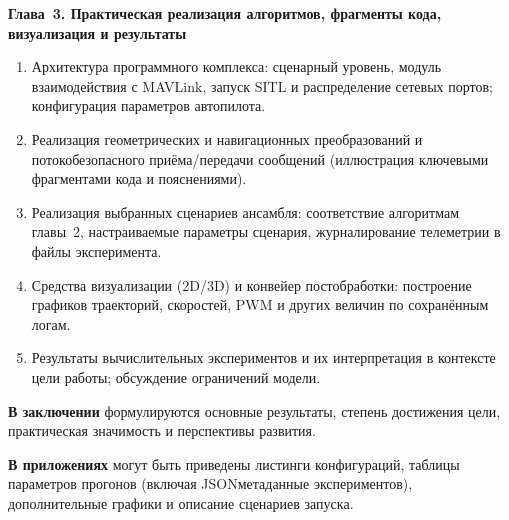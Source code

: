 \documentclass[12pt,a4paper]{article}
\begin{document}
\textbf{Глава~3. Практическая реализация алгоритмов, фрагменты кода,
визуализация и результаты}
\begin{enumerate}
  \item Архитектура программного комплекса: сценарный уровень,
    модуль взаимодействия с MAVLink, запуск SITL и распределение
    сетевых портов; конфигурация параметров автопилота.
  \item Реализация геометрических и навигационных преобразований
    и потокобезопасного приёма/передачи сообщений (иллюстрация
    ключевыми фрагментами кода и пояснениями).
  \item Реализация выбранных сценариев ансамбля: соответствие
    алгоритмам главы~2, настраиваемые параметры сценария,
    журналирование телеметрии в файлы эксперимента.
  \item Средства визуализации (2D/3D) и конвейер постобработки:
    построение графиков траекторий, скоростей, PWM и других
    величин по сохранённым логам.
  \item Результаты вычислительных экспериментов и их интерпретация
    в контексте цели работы; обсуждение ограничений модели.
\end{enumerate}

\textbf{В заключении} формулируются основные результаты, степень
достижения цели, практическая значимость и перспективы развития.

\textbf{В приложениях} могут быть приведены листинги конфигураций,
таблицы параметров прогонов (включая JSON\-метаданные экспериментов),
дополнительные графики и описание сценариев запуска.
\end{document}
